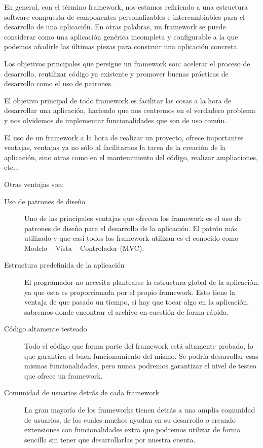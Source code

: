 En general, con el término framework, nos estamos refiriendo a una estructura software compuesta de componentes personalizables e intercambiables para el desarrollo de una aplicación. En otras palabras, un framework se puede considerar como una aplicación genérica incompleta y configurable a la que podemos añadirle las últimas piezas para construir una aplicación concreta. 

Los objetivos principales que persigue un framework son: acelerar el proceso de desarrollo, reutilizar código ya existente y promover buenas prácticas de desarrollo como el uso de patrones.

El objetivo principal de todo framework es facilitar las cosas a la hora de desarrollar una aplicación, haciendo que nos centremos en el verdadero problema y nos olvidemos de implementar funcionalidades que son de uso común.

El uso de un framework a la hora de realizar un proyecto, ofrece importantes ventajas, ventajas ya no sólo al facilitarnos la tarea de la creación de la aplicación, sino otras como en el mantenimiento del código, realizar ampliaciones, etc...

Otras ventajas son:
\begin{description}
    \item[Uso de patrones de diseño] Uno de las principales ventajas que ofrecen los framework es el uso de patrones de diseño para el desarrollo de la aplicación. El patrón más utilizado y que casi todos los framework utilizan es el conocido como Modelo – Vista – Controlador (MVC).
    
    \item[Estructura predefinida de la aplicación] El programador no necesita plantearse la estructura global de la aplicación, ya que esta es    proporcionada por el propio framework. Esto tiene la ventaja de que pasado un tiempo, si hay  que tocar algo en la aplicación, sabremos donde encontrar el archivo en cuestión de forma rápida.
    
    \item[Código altamente testeado] Todo el código que forma parte del framework está altamente probado, lo que garantiza el buen    funcionamiento del mismo. Se podría desarrollar esas mismas funcionalidades, pero   nunca podremos garantizar el nivel de testeo que ofrece un framework.
    
    \item[Comunidad de usuarios detrás de cada framework] La gran mayoría de los frameworks tienen detrás a una amplia comunidad de usuarios, de los    cuales muchos ayudan en su desarrollo o creando extensiones con funcionalidades extra que podremos utilizar de forma sencilla sin tener que desarrollarlas por nuestra cuenta.
\end{description}

